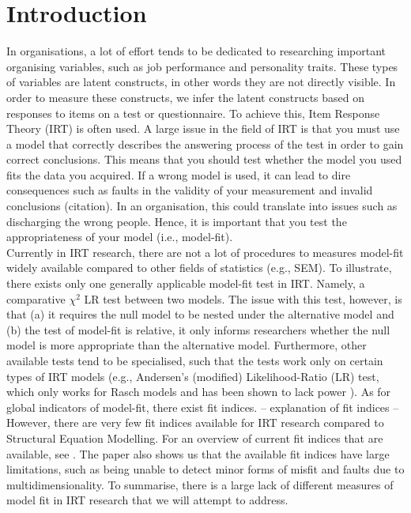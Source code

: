\documentclass{article}
\begin{document}
\part{Introduction}
In organisations, a lot of effort tends to be dedicated to researching important organising variables, such as job performance and personality traits. These types of variables are latent constructs, in other words they are not directly visible. In order to measure these constructs, we infer the latent constructs based on responses to items on a test or questionnaire. To achieve this, Item Response Theory (IRT) is often used. A large issue in the field of IRT is that you must use a model that correctly describes the answering process of the test in order to gain correct conclusions. This means that you should test whether the model you used fits the data you acquired. If a wrong model is used, it can lead to dire consequences such as faults in the validity of your measurement \autocite{consq1} and invalid conclusions (citation). In an organisation, this could translate into issues such as discharging the wrong people. Hence, it is important that you test the appropriateness of your model (i.e., model-fit). \\
\indent Currently in IRT research, there are not a lot of procedures to measures model-fit widely available  compared to other fields of statistics (e.g., SEM). To illustrate, there exists only one generally applicable model-fit test in IRT. Namely, a comparative $\chi^2$ LR test between two models. The issue with this test, however, is that (a) it requires the null model to be nested under the alternative model and (b) the test of model-fit is relative, it only informs researchers whether the null model is more appropriate than the alternative model. Furthermore, other available tests tend to be specialised, such that the tests work only on certain types of IRT models (e.g., Andersen's (modified) Likelihood-Ratio (LR) test, which only works for Rasch models and has been shown to lack power \autocite{ref2}). As for global indicators of model-fit, there exist fit indices. -- explanation of fit indices -- However, there are very few fit indices available for IRT research compared to Structural Equation Modelling. For an overview of current fit indices that are available, see \textcite{ref1}. The paper also shows us that the available fit indices have large limitations, such as being unable to detect minor forms of misfit and faults due to multidimensionality. To summarise, there is a large lack of different measures of model fit in IRT research that we will attempt to address.\\
\end{document}
